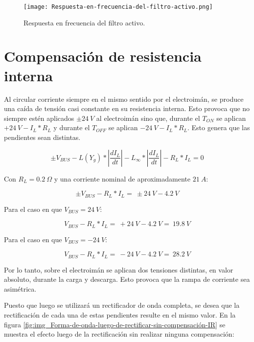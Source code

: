 \begin{figure}[H]
	\centering
	\texttt{[image: Respuesta-en-frecuencia-del-filtro-activo.png]}
	\caption{Respuesta en frecuencia del filtro activo.}
	\label{fig:img_Respuesta-en-frecuencia-del-filtro-activo}
\end{figure}

\section{Compensaci\'{o}n de resistencia interna}

\noindent Al circular corriente siempre en el mismo sentido por el electroim\'{a}n, se produce una ca\'{i}da de tensi\'{o}n casi constante en su resistencia interna. Esto provoca que no siempre est\'{e}n aplicados $\pm 24\:V$ al electroim\'{a}n sino que, durante el $T_{ON}$ se aplican $+24\:V-I_L*R_L$ y durante el $T_{OFF}$ se aplican $-24\:V-I_L*R_L$. Esto genera que las pendientes sean distintas.

\begin{equation} \label{eq_Vbus-didt-RL}
\pm V_{BUS}-L(Y_g)*\left|\frac{{dI}_L}{dt}\right|-L_{\infty }*\left|\frac{{dI}_L}{dt}\right|-R_L*I_L=0
\end{equation}

\noindent Con  $R_L=0.2 \:\Omega$ y una corriente nominal  de aproximadamente $21\:A$:

\begin{equation} \label{eq_Vbus-didt-RL-2}
\pm V_{BUS}-R_L*I_L=\ \pm 24\:V-4.2\:V
\end{equation}

\noindent Para el caso en que $V_{BUS}=24\:V$:

\begin{equation} \label{eq_Vbus-didt-RL-3}
	V_{BUS}-R_L*I_L=\ +24\:V-4.2\:V=\ 19.8\:V
\end{equation}

\noindent Para el caso en que $V_{BUS}=-24\:V$:

\begin{equation} \label{eq_Vbus-didt-RL-4}
	V_{BUS}-R_L*I_L=\ -24\:V-4.2\:V=\ 28.2\:V
\end{equation}

\noindent Por lo tanto, sobre el electroim\'{a}n se aplican dos tensiones distintas, en valor absoluto, durante la carga y descarga. Esto provoca que la rampa de corriente sea asim\'{e}trica.

\noindent Puesto que luego se utilizar\'{a} un rectificador de onda completa, se desea que la rectificaci\'{o}n de cada una de estas pendientes resulte en el mismo valor. En la figura \ref{fig:img_Forma-de-onda-luego-de-rectificar-sin-compensación-IR} se muestra el efecto luego de la rectificaci\'{o}n sin realizar ninguna compensaci\'{o}n:

